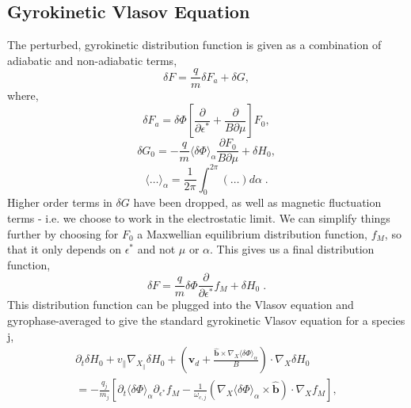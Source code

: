 \documentclass[12pt]{article}
\numberwithin{equation}{subsection}
\begin{document}
\subsection{Gyrokinetic Vlasov Equation}
   \quad The perturbed, gyrokinetic distribution function is given as a combination of adiabatic
and non-adiabatic terms\cite{FriemanChen},
   \begin{equation}
      \delta F = \frac{q}{m}\delta F_a + \delta G,
   \end{equation}
where,    
   \begin{equation}
      \delta F_a = \delta\Phi[\frac{\partial}{\partial\epsilon^*} + \frac{\partial}{B\partial\mu}]F_0, 
   \end{equation}
   \begin{equation}
      \delta G_0 = -\frac{q}{m}\langle\delta\Phi\rangle_\alpha\frac{\partial F_0}{B\partial\mu} + \delta H_0,
   \end{equation}
   \begin{equation}
      \langle\ldots\rangle_\alpha = \frac{1}{2\pi}\int_{0}^{2\pi}(\ldots)d\alpha\;.
   \end{equation}
Higher order terms in $\delta G$ have been dropped, as well as magnetic fluctuation terms - i.e. we choose to
work in the electrostatic limit. We can simplify things further by choosing for $F_0$ a Maxwellian equilibrium
distribution function, $f_M$, so that it only depends on $\epsilon^*$ and not $\mu$ or $\alpha$. This gives us
a final distribution function,
   \begin{equation}
      \delta F = \frac{q}{m}\delta\Phi\frac{\partial}{\partial\epsilon^*}f_M + \delta H_0\;.
   \end{equation}
This distribution function can be plugged into the Vlasov equation and gyrophase-averaged to give the standard gyrokinetic Vlasov
equation for a species j\cite{FriemanChen},
   \begin{equation}
   \begin{aligned}
        \partial_t\delta H_0 + v_\parallel\nabla_{X_\parallel}\delta H_0 +
        (\bm{v}_d + \frac{\bm{\hat{b}}\times\nabla_X\langle\delta\Phi\rangle_\alpha}{B})\cdot\nabla_X\delta H_0 \\
      = -\frac{q_j}{m_j}[\partial_t\langle\delta\Phi\rangle_\alpha\partial_{\epsilon^*} f_M
        -\frac{1}{\omega_{c,j}}(\nabla_X\langle\delta\Phi\rangle_\alpha\times\bm{\hat{b}})\cdot\nabla_X f_M],
   \end{aligned}
   \end{equation}
\end{document}

